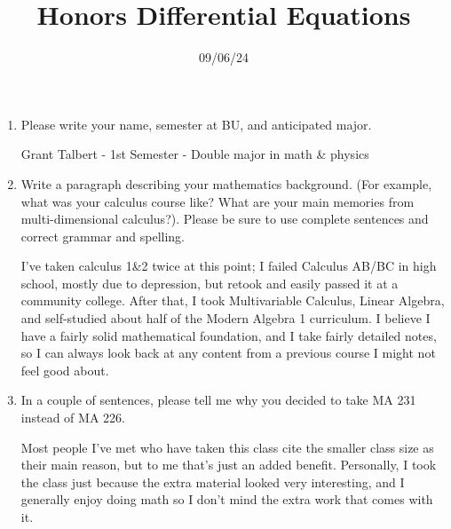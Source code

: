 \documentclass[11pt, letterpaper]{report}
\title{Honors Differential Equations}
\date{09/06/24}
\begin{document}
 \makeproblem
 \begin{enumerate}
	 \item Please write your name, semester at BU, and anticipated major.\par
	 Grant Talbert - 1st Semester - Double major in math \& physics
 	 \item Write a paragraph describing your mathematics background. (For example, what was your calculus course like? What are your main memories from multi-dimensional calculus?). Please be sure to use complete sentences and correct grammar and spelling.\par
		 I've taken calculus 1\&2 twice at this point; I failed Calculus AB/BC in high school, mostly due to depression, but retook and easily passed it at a community college. After that, I took Multivariable Calculus, Linear Algebra, and self-studied about half of the Modern Algebra 1 curriculum. I believe I have a fairly solid mathematical foundation, and I take fairly detailed notes, so I can always look back at any content from a previous course I might not feel good about.
	 \item In a couple of sentences, please tell me why you decided to take MA 231 instead of MA 226.\par
	 Most people I've met who have taken this class cite the smaller class size as their main reason, but to me that's just an added benefit. Personally, I took the class just because the extra material looked very interesting, and I generally enjoy doing math so I don't mind the extra work that comes with it.
 \end{enumerate}
\end{document}
